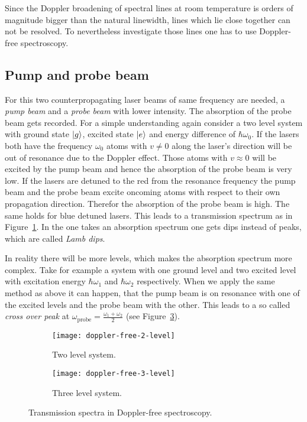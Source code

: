\documentclass[11pt, english, fleqn, DIV=15, headinclude, BCOR=2cm]{scrreprt}
\begin{document}
Since the Doppler broadening of spectral lines at room temperature is orders of
magnitude bigger than the natural linewidth, lines which lie close together can
not be resolved. To nevertheless investigate those lines one has to use
Doppler-free spectroscopy.

\subsection{Pump and probe beam}

For this two counterpropagating laser beams of same frequency are needed, a
\emph{pump beam} and a \emph{probe beam} with lower intensity. The absorption
of the probe beam gets recorded. For a simple understanding again consider a
two level system with ground state $\ket{g}$, excited state $\ket{e}$ and
energy difference of $\hbar\omega_0$. If the lasers both have the frequency
$\omega_0$ atoms with $v\neq0$ along the laser's direction will be out of
resonance due to the Doppler effect. Those atoms with $v\approx 0$ will be
excited by the pump beam and hence the absorption of the probe beam is very
low. If the lasers are detuned to the red from the resonance frequency the pump
beam and the probe beam excite oncoming atoms with respect to their own
propagation direction. Therefor the absorption of the probe beam is high.
The same holds for blue detuned lasers. This leads to a transmission spectrum as
in Figure~\ref{fig:doppler-free-2-level}. In the one takes an absorption
spectrum one gets dips instead of peaks, which are called \emph{Lamb dips}.

In reality there will be more levels, which makes the absorption spectrum more
complex. Take for example a system with one ground level and two excited level
with excitation energy $\hbar\omega_1$ and $\hbar\omega_2$ respectively. When
we apply the same method as above it can happen, that the pump beam is on
resonance with one of the excited levels and the probe beam with the other.
This leads to a so called \emph{cross over peak} at $\omega_\text{probe} =
\frac{\omega_1+\omega_2}2$ (see
Figure~\ref{fig:doppler-free-3-level}).

\begin{figure}
    \begin{subfigure}{.5\textwidth}
        \centering
        \texttt{[image: doppler-free-2-level]}
        \caption{%
            Two level system.
        }
        \label{fig:doppler-free-2-level}
    \end{subfigure}
    \hfill
    \begin{subfigure}{.5\textwidth}
        \centering
        \texttt{[image: doppler-free-3-level]}
        \caption{%
            Three level system.
        }
        \label{fig:doppler-free-3-level}
    \end{subfigure}
    \caption{%
        Transmission spectra in Doppler-free spectroscopy.
    }
\end{figure}
\end{document}
